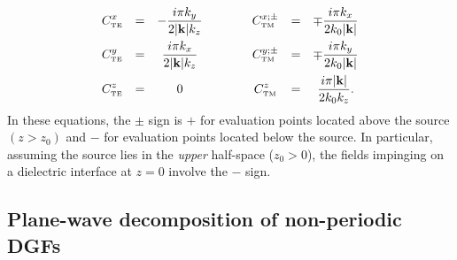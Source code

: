 \documentclass[letterpaper]{article}
\begin{document}
$$\begin{array}{ccccccc}
 \displaystyle{ C^{x}_{\hbox{\tiny{TE}}} }
 &=& 
  \displaystyle{ -\frac{ i \pi k_y}{2|\mathbf{k}|k_z} }
 &\qquad&
 \displaystyle{ C^{x;\pm}_{\hbox{\tiny{TM}}} }
 &=& 
 \displaystyle{ \mp \frac{ i \pi k_x }{2k_0|\mathbf{k}|} }
\\[10pt]
 \displaystyle{ C^{y}_{\hbox{\tiny{TE}}} }
 &=& 
  \displaystyle{ \frac{ i \pi k_x}{2|\mathbf{k}|k_z} }
 &\qquad&
 \displaystyle{ C^{y;\pm}_{\hbox{\tiny{TM}}} }
 &=& 
 \displaystyle{ \mp \frac{ i \pi k_y }{2k_0|\mathbf{k}|} }
\\[10pt]
 \displaystyle{ C^{z}_{\hbox{\tiny{TE}}} }
 &=& 0
 &\qquad&
 \displaystyle{ C^{z}_{\hbox{\tiny{TM}}} }
 &=& \displaystyle{ \frac{ i\pi |\mathbf{k}|  }{2k_0 k_z} }.
\end{array}$$
In these equations, the $\pm$ sign is $+$ for evaluation points 
located above the source $(z>z_0)$ and $-$ for evaluation points
located below the source. In particular, assuming the 
source lies in the \textit{upper} half-space ($z_0>0$), 
the fields impinging on a dielectric interface at $z=0$
involve the $-$ sign.

\subsection{Plane-wave decomposition of non-periodic DGFs}
\end{document}
